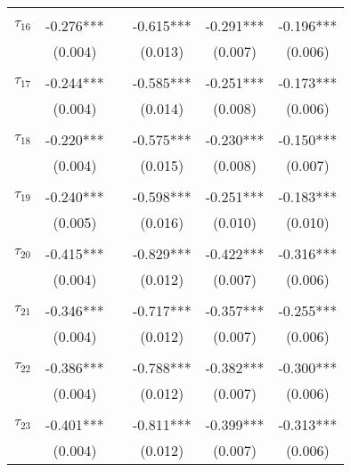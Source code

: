 \begin{tabular}{@{\extracolsep{-5pt}}lccccc}
                &           &&           &           &           \\[-2.1ex]
$\tau_{16}$     & -0.276*** && -0.615*** & -0.291*** & -0.196*** \\
                &  (0.004)  &&  (0.013)  &  (0.007)  &  (0.006)  \\
                &           &&           &           &           \\[-2.1ex]
$\tau_{17}$     & -0.244*** && -0.585*** & -0.251*** & -0.173*** \\
                &  (0.004)  &&  (0.014)  &  (0.008)  &  (0.006)  \\
                &           &&           &           &           \\[-2.1ex]
$\tau_{18}$     & -0.220*** && -0.575*** & -0.230*** & -0.150*** \\
                &  (0.004)  &&  (0.015)  &  (0.008)  &  (0.007)  \\
                &           &&           &           &           \\[-2.1ex]
$\tau_{19}$     & -0.240*** && -0.598*** & -0.251*** & -0.183*** \\
                &  (0.005)  &&  (0.016)  &  (0.010)  &  (0.010)  \\
                &           &&           &           &           \\[-2.1ex]
$\tau_{20}$     & -0.415*** && -0.829*** & -0.422*** & -0.316*** \\
                &  (0.004)  &&  (0.012)  &  (0.007)  &  (0.006)  \\
                &           &&           &           &           \\[-2.1ex]
$\tau_{21}$     & -0.346*** && -0.717*** & -0.357*** & -0.255*** \\
                &  (0.004)  &&  (0.012)  &  (0.007)  &  (0.006)  \\
                &           &&           &           &           \\[-2.1ex]
$\tau_{22}$     & -0.386*** && -0.788*** & -0.382*** & -0.300*** \\
                &  (0.004)  &&  (0.012)  &  (0.007)  &  (0.006)  \\
                &           &&           &           &           \\[-2.1ex]
$\tau_{23}$     & -0.401*** && -0.811*** & -0.399*** & -0.313*** \\
                &  (0.004)  &&  (0.012)  &  (0.007)  &  (0.006)  \\

\end{tabular}
